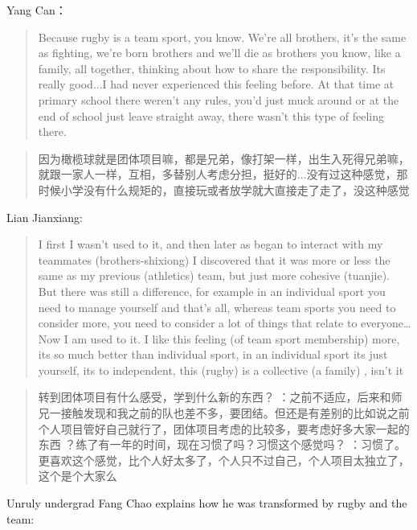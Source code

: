 \begin{CJK}{UTF8}{gbsn}
          Yang Can：
          \begin{quotation}
            Because rugby is a team sport, you know. We’re all brothers, it's the same as fighting, we’re born brothers and we’ll die as brothers you know, like a family, all together, thinking about how to share the responsibility. Its really good...I had never experienced this feeling before.  At that time at primary school there weren’t any rules, you’d just muck around or at the end of school just leave straight away, there wasn’t this type of feeling there.
          \end{quotation}


          \begin{quotation}
            因为橄榄球就是团体项目嘛，都是兄弟，像打架一样，出生入死得兄弟嘛，就跟一家人一样，互相，多替别人考虑分担，挺好的...没有过这种感觉，那时候小学没有什么规矩的，直接玩或者放学就大直接走了走了，没这种感觉
          \end{quotation}


          Lian Jianxiang:
          \begin{quotation}
             I first I wasn’t used to it, and then later as began to interact with my teammates (brothers-shixiong) I discovered that it was more or less the same as my previous (athletics) team, but just more cohesive (tuanjie).  But there was still a difference, for example in an individual sport you need to manage yourself and that's all, whereas team sports you need to consider more, you need to consider a lot of things that relate to everyone…Now I am used to it. I like this feeling (of team sport membership) more, its so much better than individual sport, in an individual sport its just yourself, its to independent, this (rugby) is a collective  (a family) , isn’t it
          \end{quotation}


          \begin{quotation}
            转到团体项目有什么感受，学到什么新的东西？
           ：之前不适应，后来和师兄一接触发现和我之前的队也差不多，要团结。但还是有差别的比如说之前个人项目管好自己就行了，团体项目考虑的比较多，要考虑好多大家一起的东西
           ？练了有一年的时间，现在习惯了吗？习惯这个感觉吗？
           ：习惯了。更喜欢这个感觉，比个人好太多了，个人只不过自己，个人项目太独立了，这个是个大家么
          \end{quotation}



          Unruly undergrad Fang Chao explains how he was transformed by rugby and the team:


\end{CJK}
